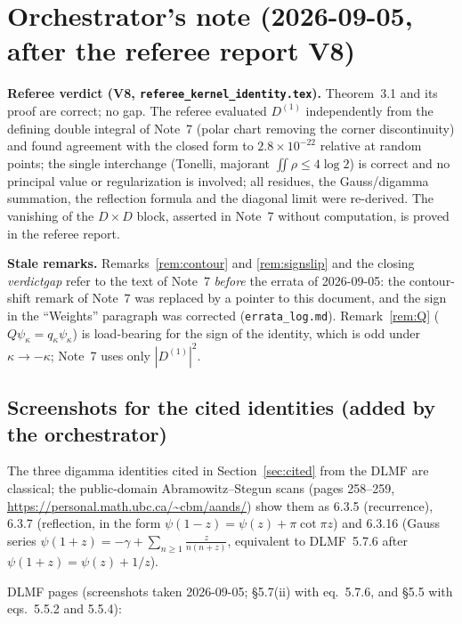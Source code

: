 \documentclass[11pt]{article}
\begin{document}
\section*{Orchestrator's note (2026-09-05, after the referee report V8)}
\begin{verdictok}
\textbf{Referee verdict (V8, \texttt{referee\_kernel\_identity.tex}).} Theorem~3.1 and its proof are correct; no gap.  The referee evaluated \(D^{(1)}\) independently from the defining double integral of Note~7 (polar chart removing the corner discontinuity) and found agreement with the closed form to \(2.8\times10^{-22}\) relative at random points; the single interchange (Tonelli, majorant \(\iint\rho\le4\log2\)) is correct and no principal value or regularization is involved; all residues, the Gauss/digamma summation, the reflection formula and the diagonal limit were re-derived.  The vanishing of the \(D\times D\) block, asserted in Note~7 without computation, is proved in the referee report.

\textbf{Stale remarks.} Remarks~\ref{rem:contour} and \ref{rem:signslip} and the closing \emph{verdictgap} refer to the text of Note~7 \emph{before} the errata of 2026-09-05: the contour-shift remark of Note~7 was replaced by a pointer to this document, and the sign in the ``Weights'' paragraph was corrected (\texttt{errata\_log.md}).  Remark~\ref{rem:Q} (\(Q\psi_\kappa=q_\kappa\psi_\kappa\)) is load-bearing for the sign of the identity, which is odd under \(\kappa\to-\kappa\); Note~7 uses only \(|D^{(1)}|^2\).
\end{verdictok}

\subsection*{Screenshots for the cited identities (added by the orchestrator)}
The three digamma identities cited in Section~\ref{sec:cited} from the DLMF are classical; the public-domain Abramowitz--Stegun scans (pages 258--259, \url{https://personal.math.ubc.ca/~cbm/aands/}) show them as 6.3.5 (recurrence), 6.3.7 (reflection, in the form \(\psi(1-z)=\psi(z)+\pi\cot\pi z\)) and 6.3.16 (Gauss series \(\psi(1+z)=-\gamma+\sum_{n\ge1}\frac{z}{n(n+z)}\), equivalent to DLMF~5.7.6 after \(\psi(1+z)=\psi(z)+1/z\)).
\begin{center}
\hfill
{}
\end{center}
DLMF pages (screenshots taken 2026-09-05; \S5.7(ii) with eq.~5.7.6, and \S5.5 with eqs.~5.5.2 and 5.5.4):
\begin{center}
\hfill
{}
\end{center}
\end{document}
